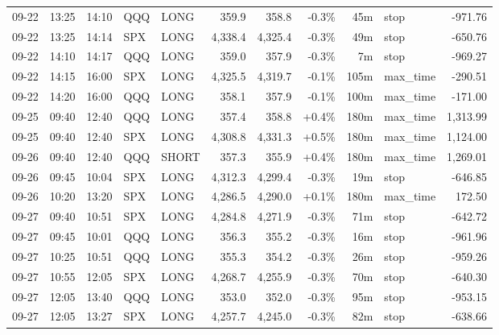 \documentclass[11pt,a4paper,twoside]{article}
\begin{document}
\begin{center}
\begin{longtable}{>{\color{txtmain}}l l l l l r r r r >{\color{txtmain}}l r}
09-22 & 13:25 & 14:10 & QQQ & LONG & 359.9 & 358.8 & \textcolor{lossred}{-0.3\%} & 45m & stop & \textcolor{lossred}{-971.76} \\
09-22 & 13:25 & 14:14 & SPX & LONG & 4,338.4 & 4,325.4 & \textcolor{lossred}{-0.3\%} & 49m & stop & \textcolor{lossred}{-650.76} \\
09-22 & 14:10 & 14:17 & QQQ & LONG & 359.0 & 357.9 & \textcolor{lossred}{-0.3\%} & 7m & stop & \textcolor{lossred}{-969.27} \\
09-22 & 14:15 & 16:00 & SPX & LONG & 4,325.5 & 4,319.7 & \textcolor{lossred}{-0.1\%} & 105m & max\_time & \textcolor{lossred}{-290.51} \\
09-22 & 14:20 & 16:00 & QQQ & LONG & 358.1 & 357.9 & \textcolor{lossred}{-0.1\%} & 100m & max\_time & \textcolor{lossred}{-171.00} \\
09-25 & 09:40 & 12:40 & QQQ & LONG & 357.4 & 358.8 & \textcolor{wingreen}{+0.4\%} & 180m & max\_time & \textcolor{wingreen}{1,313.99} \\
09-25 & 09:40 & 12:40 & SPX & LONG & 4,308.8 & 4,331.3 & \textcolor{wingreen}{+0.5\%} & 180m & max\_time & \textcolor{wingreen}{1,124.00} \\
09-26 & 09:40 & 12:40 & QQQ & SHORT & 357.3 & 355.9 & \textcolor{wingreen}{+0.4\%} & 180m & max\_time & \textcolor{wingreen}{1,269.01} \\
09-26 & 09:45 & 10:04 & SPX & LONG & 4,312.3 & 4,299.4 & \textcolor{lossred}{-0.3\%} & 19m & stop & \textcolor{lossred}{-646.85} \\
09-26 & 10:20 & 13:20 & SPX & LONG & 4,286.5 & 4,290.0 & \textcolor{wingreen}{+0.1\%} & 180m & max\_time & \textcolor{wingreen}{172.50} \\
09-27 & 09:40 & 10:51 & SPX & LONG & 4,284.8 & 4,271.9 & \textcolor{lossred}{-0.3\%} & 71m & stop & \textcolor{lossred}{-642.72} \\
09-27 & 09:45 & 10:01 & QQQ & LONG & 356.3 & 355.2 & \textcolor{lossred}{-0.3\%} & 16m & stop & \textcolor{lossred}{-961.96} \\
09-27 & 10:25 & 10:51 & QQQ & LONG & 355.3 & 354.2 & \textcolor{lossred}{-0.3\%} & 26m & stop & \textcolor{lossred}{-959.26} \\
09-27 & 10:55 & 12:05 & SPX & LONG & 4,268.7 & 4,255.9 & \textcolor{lossred}{-0.3\%} & 70m & stop & \textcolor{lossred}{-640.30} \\
09-27 & 12:05 & 13:40 & QQQ & LONG & 353.0 & 352.0 & \textcolor{lossred}{-0.3\%} & 95m & stop & \textcolor{lossred}{-953.15} \\
09-27 & 12:05 & 13:27 & SPX & LONG & 4,257.7 & 4,245.0 & \textcolor{lossred}{-0.3\%} & 82m & stop & \textcolor{lossred}{-638.66} \\

\end{longtable}
\end{center}
\end{document}
